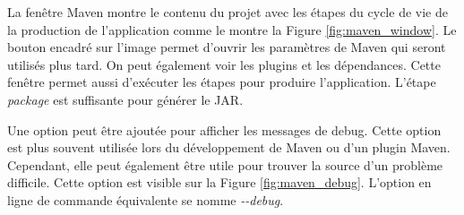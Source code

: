 \subtitle{Fenêtre Maven}

La fenêtre \gls{Maven} montre le contenu du projet avec les étapes du cycle de vie de la production de l'application comme le montre la Figure \ref{fig:maven_window}. Le bouton encadré sur l'image permet d'ouvrir les paramètres de \gls{Maven} qui seront utilisés plus tard. On peut également voir les plugins et les dépendances. Cette fenêtre permet aussi d'exécuter les étapes pour produire l'application. L'étape \textit{package} est suffisante pour générer le \gls{JAR}.

\begin{minipage}{\linewidth}
\label{fig:maven_window}
\end{minipage}

Une option peut être ajoutée pour afficher les messages de debug. Cette option est plus souvent utilisée lors du développement de \gls{Maven} ou d'un plugin \gls{Maven}. Cependant, elle peut également être utile pour trouver la source d'un problème difficile. Cette option est visible sur la Figure \ref{fig:maven_debug}. L'option en ligne de commande équivalente se nomme \textit{-{}-debug}.

\begin{minipage}{\linewidth}
\label{fig:maven_debug}
\end{minipage}